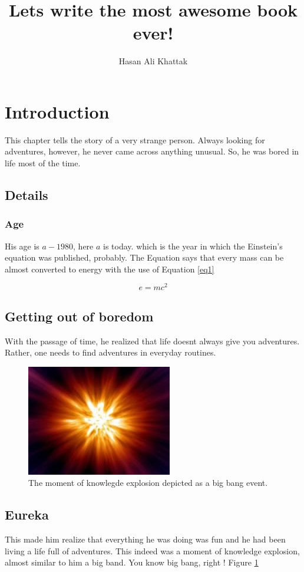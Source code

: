 \documentclass{report}
\title{Lets write the most awesome book ever!}
\author{Hasan Ali Khattak}
\begin{document}
\maketitle

\section*{Introduction}
This chapter tells the story of a very strange person. Always looking for adventures, however, he never came across anything unusual. So, he was bored in life most of the time.

\subsection{Details}
\subsubsection{Age}
His age is $ a - 1980$, here $a$ is today. which is the year in which the Einstein's equation was published, probably. %
The Equation says that every mass can be almost converted to energy with the use of Equation \ref{eq1}

\begin{equation}\label{eq1}
    e = m c^2
\end{equation}

\subsection{Getting out of boredom}
With the passage of time, he realized that life doesnt always give you adventures. Rather, one needs to find adventures in everyday routines.

\begin{figure}[pb]
    \centering
    \includegraphics[width=0.5\linewidth]{figs/bigBangPicture.png}
    \caption{The moment of knowlegde explosion depicted as a big bang event.}
    \label{fig1:bigBangPicture}
\end{figure}

\subsection{Eureka}
This made him realize that everything he was doing was fun and he had been living a life full of adventures. This indeed was a moment of knowledge explosion, almost similar to him a big band. You know big bang, right ! Figure \ref{fig1:bigBangPicture}
\end{document}
